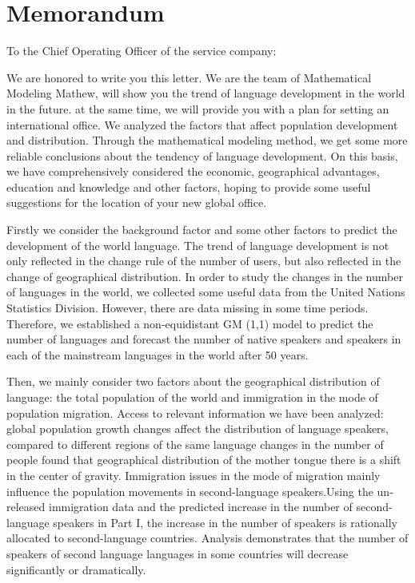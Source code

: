 \newpage
\section{Memorandum}
\noindent
To the Chief Operating Officer of the service company:

We are honored to write you this letter. We are the team of Mathematical Modeling Mathew, will show you the trend of language development in the world in the future. at the same time, we will provide you with a plan for setting an international office. We analyzed the factors that affect population development and distribution. Through the mathematical modeling method, we get some more reliable conclusions about the tendency of language development. On this basis, we have comprehensively considered the economic, geographical advantages, education and knowledge and other factors, hoping to provide some useful suggestions for the location of your new global office.

Firstly we consider the background factor and some other factors to predict the development of the world language. The trend of language development is not only reflected in the change rule of the number of users, but also reflected in the change of geographical distribution. In order to study the changes in the number of languages in the world, we collected some useful data from the United Nations Statistics Division. However, there are data missing in some time periods. Therefore, we established a non-equidistant GM (1,1) model to predict the number of languages and forecast the number of native speakers and speakers in each of the mainstream languages in the world after 50 years.

Then, we mainly consider two factors about the geographical distribution of language: the total population of the world and immigration in the mode of population migration. Access to relevant information we have been analyzed: global population growth changes affect the distribution of language speakers, compared to different regions of the same language changes in the number of people found that geographical distribution of the mother tongue there is a shift in the center of gravity.
Immigration issues in the mode of migration mainly influence the population movements in second-language speakers.Using the un-released immigration data and the predicted increase in the number of second-language speakers in Part I, the increase in the number of speakers is rationally allocated to second-language countries. Analysis demonstrates that the number of speakers of second language languages in some countries will decrease significantly or dramatically.

